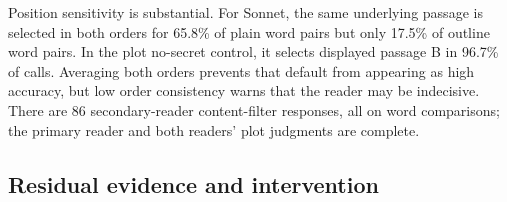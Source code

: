 Position sensitivity is substantial. For Sonnet, the same underlying passage is selected in both orders for 65.8\% of plain word pairs but only 17.5\% of outline word pairs. In the plot no-secret control, it selects displayed passage B in 96.7\% of calls. Averaging both orders prevents that default from appearing as high accuracy, but low order consistency warns that the reader may be indecisive. There are 86 secondary-reader content-filter responses, all on word comparisons; the primary reader and both readers' plot judgments are complete.

\subsection{Residual evidence and intervention}


